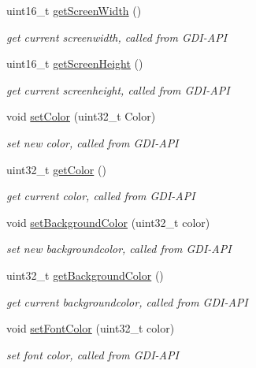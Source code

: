 \begin{CompactItemize}
uint16\_\-t \hyperlink{group__graphic__device_g6421d0855aedae698f7a483392ffd25c}{getScreenWidth} ()
\begin{CompactList}\small\item\em get current screenwidth, called from GDI-API \item\end{CompactList}\item 
uint16\_\-t \hyperlink{group__graphic__device_g097b85d7f413373b20867a9415cabbed}{getScreenHeight} ()
\begin{CompactList}\small\item\em get current screenheight, called from GDI-API \item\end{CompactList}\item 
void \hyperlink{group__graphic__device_ga22a0dd9dcea4d5c82fae9be9bf089f0}{setColor} (uint32\_\-t Color)
\begin{CompactList}\small\item\em set new color, called from GDI-API \item\end{CompactList}\item 
uint32\_\-t \hyperlink{group__graphic__device_ga7f56f8fafb90e55a6af7ac7646df124}{getColor} ()
\begin{CompactList}\small\item\em get current color, called from GDI-API \item\end{CompactList}\item 
void \hyperlink{group__graphic__device_gc8bf090a80d7fe12147b6d87fd1ee83b}{setBackgroundColor} (uint32\_\-t color)
\begin{CompactList}\small\item\em set new backgroundcolor, called from GDI-API \item\end{CompactList}\item 
uint32\_\-t \hyperlink{group__graphic__device_g81bda3c8db3821062fba08e5ecb2d90d}{getBackgroundColor} ()
\begin{CompactList}\small\item\em get current backgroundcolor, called from GDI-API \item\end{CompactList}\item 
void \hyperlink{group__graphic__device_g3efd6ee7243705cce37b440c68399546}{setFontColor} (uint32\_\-t color)
\begin{CompactList}\small\item\em set font color, called from GDI-API \item\end{CompactList}\item 

\end{CompactItemize}
